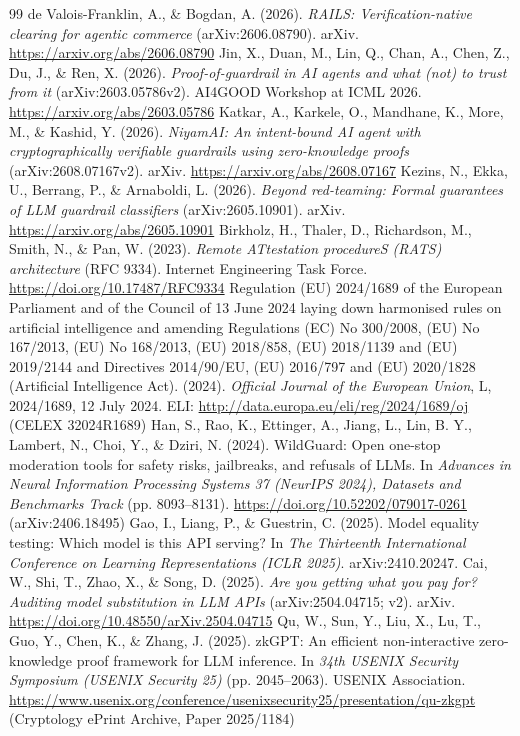 \documentclass[11pt]{article}
\begin{document}
\begin{thebibliography}{99}
 de Valois-Franklin, A., \& Bogdan, A. (2026). \emph{RAILS: Verification-native clearing for agentic commerce} (arXiv:2606.08790). arXiv. \url{https://arxiv.org/abs/2606.08790}
 Jin, X., Duan, M., Lin, Q., Chan, A., Chen, Z., Du, J., \& Ren, X. (2026). \emph{Proof-of-guardrail in AI agents and what (not) to trust from it} (arXiv:2603.05786v2). AI4GOOD Workshop at ICML 2026. \url{https://arxiv.org/abs/2603.05786}
 Katkar, A., Karkele, O., Mandhane, K., More, M., \& Kashid, Y. (2026). \emph{NiyamAI: An intent-bound AI agent with cryptographically verifiable guardrails using zero-knowledge proofs} (arXiv:2608.07167v2). arXiv. \url{https://arxiv.org/abs/2608.07167}
 Kezins, N., Ekka, U., Berrang, P., \& Arnaboldi, L. (2026). \emph{Beyond red-teaming: Formal guarantees of LLM guardrail classifiers} (arXiv:2605.10901). arXiv. \url{https://arxiv.org/abs/2605.10901}
 Birkholz, H., Thaler, D., Richardson, M., Smith, N., \& Pan, W. (2023). \emph{Remote ATtestation procedureS (RATS) architecture} (RFC 9334). Internet Engineering Task Force. \url{https://doi.org/10.17487/RFC9334}
 Regulation (EU) 2024/1689 of the European Parliament and of the Council of 13 June 2024 laying down harmonised rules on artificial intelligence and amending Regulations (EC) No 300/2008, (EU) No 167/2013, (EU) No 168/2013, (EU) 2018/858, (EU) 2018/1139 and (EU) 2019/2144 and Directives 2014/90/EU, (EU) 2016/797 and (EU) 2020/1828 (Artificial Intelligence Act). (2024). \emph{Official Journal of the European Union}, L, 2024/1689, 12 July 2024. ELI: \url{http://data.europa.eu/eli/reg/2024/1689/oj} (CELEX 32024R1689)
 Han, S., Rao, K., Ettinger, A., Jiang, L., Lin, B. Y., Lambert, N., Choi, Y., \& Dziri, N. (2024). WildGuard: Open one-stop moderation tools for safety risks, jailbreaks, and refusals of LLMs. In \emph{Advances in Neural Information Processing Systems 37 (NeurIPS 2024), Datasets and Benchmarks Track} (pp. 8093--8131). \url{https://doi.org/10.52202/079017-0261} (arXiv:2406.18495)
 Gao, I., Liang, P., \& Guestrin, C. (2025). Model equality testing: Which model is this API serving? In \emph{The Thirteenth International Conference on Learning Representations (ICLR 2025)}. arXiv:2410.20247.
 Cai, W., Shi, T., Zhao, X., \& Song, D. (2025). \emph{Are you getting what you pay for? Auditing model substitution in LLM APIs} (arXiv:2504.04715; v2). arXiv. \url{https://doi.org/10.48550/arXiv.2504.04715}
 Qu, W., Sun, Y., Liu, X., Lu, T., Guo, Y., Chen, K., \& Zhang, J. (2025). zkGPT: An efficient non-interactive zero-knowledge proof framework for LLM inference. In \emph{34th USENIX Security Symposium (USENIX Security 25)} (pp. 2045--2063). USENIX Association. \url{https://www.usenix.org/conference/usenixsecurity25/presentation/qu-zkgpt} (Cryptology ePrint Archive, Paper 2025/1184)

\end{thebibliography}
\end{document}
